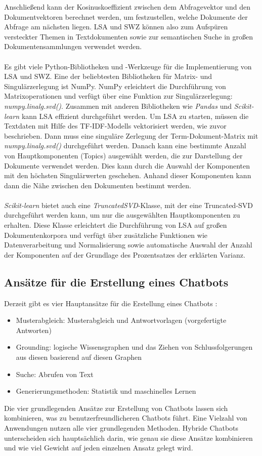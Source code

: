 Anschließend kann der Kosinuskoeffizient zwischen dem Abfragevektor und den Dokumentvektoren berechnet werden, um festzustellen, welche Dokumente der Abfrage am nächsten liegen. 
\ac{LSA} und \ac{SWZ} können also zum Aufspüren versteckter Themen in Textdokumenten sowie zur semantischen Suche in großen Dokumentensammlungen verwendet werden.\\\\
Es gibt viele Python-Bibliotheken und -Werkzeuge für die Implementierung von \ac{LSA} und \ac{SWZ}. 
Eine der beliebtesten Bibliotheken für Matrix- und Singulärzerlegung ist NumPy. 
NumPy erleichtert die Durchführung von Matrixoperationen und verfügt über eine Funktion zur Singulärzerlegung: \textit{numpy.linalg.svd()}. 
Zusammen mit anderen Bibliotheken wie \textit{Pandas} und \textit{Scikit-learn} kann \ac{LSA} effizient durchgeführt werden. 
Um \ac{LSA} zu starten, müssen die Textdaten mit Hilfe des \ac{TF-IDF}-Modells vektorisiert werden, wie zuvor beschrieben. 
Dann muss eine singuläre Zerlegung der Term-Dokument-Matrix mit \textit{numpy.linalg.svd()} durchgeführt werden. 
Danach kann eine bestimmte Anzahl von Hauptkomponenten (Topics) ausgewählt werden, die zur Darstellung der Dokumente verwendet werden. 
Dies kann durch die Auswahl der Komponenten mit den höchsten Singulärwerten geschehen. 
Anhand dieser Komponenten kann dann die Nähe zwischen den Dokumenten bestimmt werden.\\\\ 
\textit{Scikit-learn} bietet auch eine \textit{TruncatedSVD}-Klasse, mit der eine Truncated-\ac{SVD} durchgeführt werden kann, um nur die ausgewählten Hauptkomponenten zu erhalten. 
Diese Klasse erleichtert die Durchführung von \ac{LSA} auf großen Dokumentenkorpora und verfügt über zusätzliche Funktionen wie Datenverarbeitung und Normalisierung sowie automatische Auswahl der Anzahl der Komponenten auf der Grundlage des Prozentsatzes der erklärten Varianz.
\subsection{Ansätze für die Erstellung eines Chatbots}\label{sec:ansaetze_erstellung_chatbots}
Derzeit gibt es vier Hauptansätze für die Erstellung eines Chatbots \cite{lane_natural_2019}:
\begin{itemize}
    \item Musterabgleich: Musterabgleich und Antwortvorlagen (vorgefertigte Antworten)
    \item Grounding: logische Wissensgraphen und das Ziehen von Schlussfolgerungen aus diesen basierend auf diesen Graphen
    \item Suche: Abrufen von Text
    \item Generierungsmethoden: Statistik und maschinelles Lernen
\end{itemize}
Die vier grundlegenden Ansätze zur Erstellung von Chatbots lassen sich kombinieren, was zu benutzerfreundlicheren Chatbots führt. 
Eine Vielzahl von Anwendungen nutzen alle vier grundlegenden Methoden. 
Hybride Chatbots unterscheiden sich hauptsächlich darin, wie genau sie diese Ansätze kombinieren und wie viel Gewicht auf jeden einzelnen Ansatz gelegt wird.
